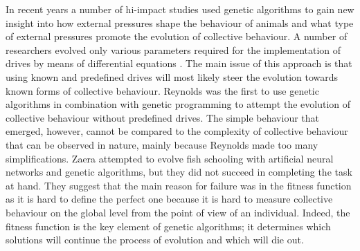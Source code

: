 In recent years a number of hi-impact studies \cite{kunz2006prey,olson2013predator,olson2016evolution,biswas2014causes,demsar2015simulating,demsar2016balanced,demsar2017evolution,hein2015evolution} used genetic algorithms to gain new insight into how external pressures shape the behaviour of animals and what type of external pressures promote the evolution of collective behaviour. A number of researchers evolved only various parameters required for the implementation of drives by means of differential equations \cite{sayers2009evolved,spector2003emergence,wood2007evolving}. The main issue of this approach is that using known and predefined drives will most likely steer the evolution towards known forms of collective behaviour. Reynolds \cite{reynolds1993evolved} was the first to use genetic algorithms \cite{holland1992adaptation} in combination with genetic programming \cite{koza1992genetic} to attempt the evolution of collective behaviour without predefined drives. The simple behaviour that emerged, however, cannot be compared to the complexity of collective behaviour that can be observed in nature, mainly because Reynolds made too many simplifications. Zaera\etal \cite{zaera1996not} attempted to evolve fish schooling with artificial neural networks and genetic algorithms, but they did not succeed in completing the task at hand. They suggest that the main reason for failure was in the fitness function as it is hard to define the perfect one because it is hard to measure collective behaviour on the global level from the point of view of an individual. Indeed, the fitness function is the key element of genetic algorithms; it determines which solutions will continue the process of evolution and which will die out.


